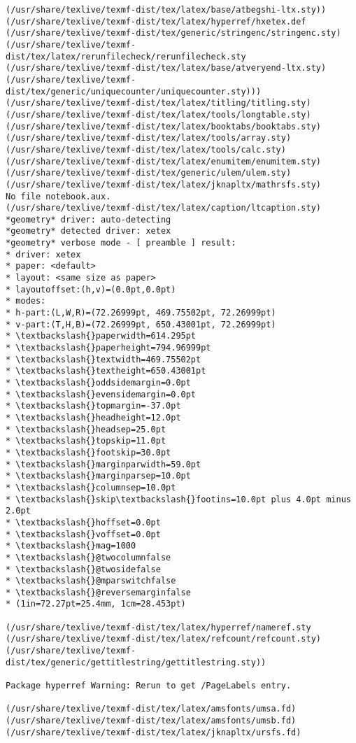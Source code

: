 \documentclass[11pt]{article}
\begin{document}
\begin{Verbatim}[commandchars=\\\{\}]
(/usr/share/texlive/texmf-dist/tex/latex/base/atbegshi-ltx.sty))
(/usr/share/texlive/texmf-dist/tex/latex/hyperref/hxetex.def
(/usr/share/texlive/texmf-dist/tex/generic/stringenc/stringenc.sty)
(/usr/share/texlive/texmf-dist/tex/latex/rerunfilecheck/rerunfilecheck.sty
(/usr/share/texlive/texmf-dist/tex/latex/base/atveryend-ltx.sty)
(/usr/share/texlive/texmf-dist/tex/generic/uniquecounter/uniquecounter.sty)))
(/usr/share/texlive/texmf-dist/tex/latex/titling/titling.sty)
(/usr/share/texlive/texmf-dist/tex/latex/tools/longtable.sty)
(/usr/share/texlive/texmf-dist/tex/latex/booktabs/booktabs.sty)
(/usr/share/texlive/texmf-dist/tex/latex/tools/array.sty)
(/usr/share/texlive/texmf-dist/tex/latex/tools/calc.sty)
(/usr/share/texlive/texmf-dist/tex/latex/enumitem/enumitem.sty)
(/usr/share/texlive/texmf-dist/tex/generic/ulem/ulem.sty)
(/usr/share/texlive/texmf-dist/tex/latex/jknapltx/mathrsfs.sty)
No file notebook.aux.
(/usr/share/texlive/texmf-dist/tex/latex/caption/ltcaption.sty)
*geometry* driver: auto-detecting
*geometry* detected driver: xetex
*geometry* verbose mode - [ preamble ] result:
* driver: xetex
* paper: <default>
* layout: <same size as paper>
* layoutoffset:(h,v)=(0.0pt,0.0pt)
* modes:
* h-part:(L,W,R)=(72.26999pt, 469.75502pt, 72.26999pt)
* v-part:(T,H,B)=(72.26999pt, 650.43001pt, 72.26999pt)
* \textbackslash{}paperwidth=614.295pt
* \textbackslash{}paperheight=794.96999pt
* \textbackslash{}textwidth=469.75502pt
* \textbackslash{}textheight=650.43001pt
* \textbackslash{}oddsidemargin=0.0pt
* \textbackslash{}evensidemargin=0.0pt
* \textbackslash{}topmargin=-37.0pt
* \textbackslash{}headheight=12.0pt
* \textbackslash{}headsep=25.0pt
* \textbackslash{}topskip=11.0pt
* \textbackslash{}footskip=30.0pt
* \textbackslash{}marginparwidth=59.0pt
* \textbackslash{}marginparsep=10.0pt
* \textbackslash{}columnsep=10.0pt
* \textbackslash{}skip\textbackslash{}footins=10.0pt plus 4.0pt minus 2.0pt
* \textbackslash{}hoffset=0.0pt
* \textbackslash{}voffset=0.0pt
* \textbackslash{}mag=1000
* \textbackslash{}@twocolumnfalse
* \textbackslash{}@twosidefalse
* \textbackslash{}@mparswitchfalse
* \textbackslash{}@reversemarginfalse
* (1in=72.27pt=25.4mm, 1cm=28.453pt)

(/usr/share/texlive/texmf-dist/tex/latex/hyperref/nameref.sty
(/usr/share/texlive/texmf-dist/tex/latex/refcount/refcount.sty)
(/usr/share/texlive/texmf-dist/tex/generic/gettitlestring/gettitlestring.sty))

Package hyperref Warning: Rerun to get /PageLabels entry.

(/usr/share/texlive/texmf-dist/tex/latex/amsfonts/umsa.fd)
(/usr/share/texlive/texmf-dist/tex/latex/amsfonts/umsb.fd)
(/usr/share/texlive/texmf-dist/tex/latex/jknapltx/ursfs.fd)


\end{Verbatim}
\end{document}
